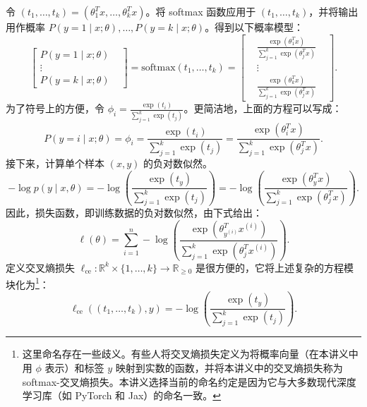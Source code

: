 令 $(t_1, \dots, t_k) = (\theta_1^T x, \dots, \theta_k^T x)$。将 softmax 函数应用于 $(t_1, \dots, t_k)$，并将输出用作概率 $P(y = 1 \mid x; \theta), \dots, P(y = k \mid x; \theta)$。得到以下概率模型：
\begin{equation}
    \begin{bmatrix} 
        P(y = 1 \mid x; \theta) \\
        \vdots& \\
        P(y = k \mid x; \theta)
    \end{bmatrix} =
    \text{softmax}(t_1, \dots, t_k) = 
    \begin{bmatrix} 
    &\frac{\exp(\theta_1^T x)}{\sum_{j=1}^k \exp(\theta_j^T x)}& \\
    &\vdots& \\
    &\frac{\exp(\theta_k^T x)}{\sum_{j=1}^k \exp(\theta_j^T x)}&
    \end{bmatrix}.
\end{equation}
为了符号上的方便，令 $\phi_i = \frac{\exp(t_i)}{\sum_{j=1}^k \exp(t_j)}$。更简洁地，上面的方程可以写成：
\begin{equation}
    P(y = i \mid x; \theta) = \phi_i = \frac{\exp(t_i)}{\sum_{j=1}^k \exp(t_j)} = \frac{\exp(\theta_i^T x)}{\sum_{j=1}^k \exp(\theta_j^T x)}.
\end{equation}
接下来，计算单个样本 $(x, y)$ 的负对数似然。
\begin{equation}
    -\log p(y \mid x, \theta) = -\log\left(\frac{\exp(t_y)}{\sum_{j=1}^k \exp(t_j)}\right) = -\log\left(\frac{\exp(\theta_y^T x)}{\sum_{j=1}^k \exp(\theta_j^T x)}\right).
\end{equation}
因此，损失函数，即训练数据的负对数似然，由下式给出：
\begin{equation}
    \ell(\theta) = \sum_{i=1}^n -\log\left(\frac{\exp(\theta_{y^{(i)}}^T x^{(i)})}{\sum_{j=1}^k \exp(\theta_j^T x^{(i)})}\right).
    \label{eq:multiclass_loss}
\end{equation}
定义交叉熵损失 $\ell_{\text{ce}}: \mathbb{R}^k \times \{1, \dots, k\} \to \mathbb{R}_{\ge 0}$ 是很方便的，它将上述复杂的方程模块化为\footnote{这里命名存在一些歧义。有些人将交叉熵损失定义为将概率向量（在本讲义中用 $\phi$ 表示）和标签 $y$ 映射到实数的函数，并将本讲义中的交叉熵损失称为 softmax-交叉熵损失。本讲义选择当前的命名约定是因为它与大多数现代深度学习库（如 PyTorch 和 Jax）的命名一致。}：
\begin{equation}
    \ell_{\text{ce}}((t_1, \dots, t_k), y) = -\log \left( \frac{\exp(t_y)}{\sum_{j=1}^k \exp(t_j)} \right).
\end{equation}
